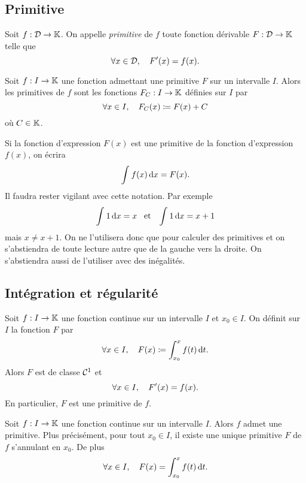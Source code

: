 \documentclass{magnolia}
\begin{document}
\subsection{Primitive}
\begin{definition}[utile=-3]
Soit $f:\mathcal{D}\to\mathbb{K}$. On appelle
\emph{primitive} de $f$ toute fonction dérivable $F:\mathcal{D}\to\mathbb{K}$ telle que
\[\forall x\in\mathcal{D} ,\quad F'(x)=f(x).\]
\end{definition}

\begin{proposition}[utile=-3]
Soit $f:I\to\mathbb{K}$ une fonction  admettant une primitive $F$ sur un
intervalle $I$. Alors les primitives de $f$ sont les fonctions $F_C:I\to\mathbb{K}$ définies
sur $I$ par
\[\forall x\in I ,\quad F_C(x)\coloneqq F(x)+C\]
où $C\in\mathbb{K}$.
\end{proposition}

\begin{remarqueUnique}
\remarque Si la fonction d'expression $F(x)$ est une primitive de la fonction d'expression $f(x)$, on écrira
  \[\int_{}^{} f(x)\,\text{d}x=F(x).\]
  Il faudra rester vigilant avec cette notation. Par exemple
  \[\int_{}^{} 1\,\text{d}x=x \quad\!\text{et}\quad\! \int_{}^{} 1\,\text{d}x=x+1\]
  mais $x\neq x+1$. On ne l'utilisera donc que pour calculer des primitives et on s'abstiendra de toute lecture autre que de la gauche vers la droite. On s'abstiendra aussi de l'utiliser avec des inégalités. 
\end{remarqueUnique}

\subsection{Intégration et régularité}

\begin{proposition}[utile=-3]
Soit $f:I\to\mathbb{K}$ une fonction continue sur un intervalle $I$ et $x_0\in I$. On
définit sur $I$ la fonction $F$ par
\[\forall x\in I ,\quad F(x)\coloneqq\int_{x_0}^{x} f(t)\,\text{d}t.\]
Alors $F$ est de classe $\mathcal{C}^{1}$ et
  \[\forall x\in I ,\quad F'(x)=f(x).\]
En particulier, $F$ est une primitive de $f$.
\end{proposition}


\begin{proposition}[utile=-3]
  Soit $f:I\to\mathbb{K}$ une fonction continue sur un intervalle $I$. Alors $f$ admet une
  primitive. Plus précisément, pour tout $x_0\in I$, il existe une unique
  primitive $F$ de $f$ s'annulant en $x_0$. De plus
  $$\forall x\in I ,\quad F(x)=\int_{x_0}^{x} f(t)\,\text{d}t.$$
\end{proposition}
\end{document}
